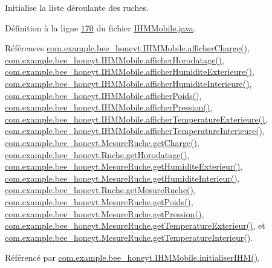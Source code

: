 Initialise la liste déroulante des ruches. 



Définition à la ligne \hyperlink{_i_h_m_mobile_8java_source_l00170}{170} du fichier \hyperlink{_i_h_m_mobile_8java_source}{I\+H\+M\+Mobile.\+java}.



Références \hyperlink{_i_h_m_mobile_8java_source_l00289}{com.\+example.\+bee\+\_\+honeyt.\+I\+H\+M\+Mobile.\+afficher\+Charge()}, \hyperlink{_i_h_m_mobile_8java_source_l00298}{com.\+example.\+bee\+\_\+honeyt.\+I\+H\+M\+Mobile.\+afficher\+Horodatage()}, \hyperlink{_i_h_m_mobile_8java_source_l00262}{com.\+example.\+bee\+\_\+honeyt.\+I\+H\+M\+Mobile.\+afficher\+Humidite\+Exterieure()}, \hyperlink{_i_h_m_mobile_8java_source_l00253}{com.\+example.\+bee\+\_\+honeyt.\+I\+H\+M\+Mobile.\+afficher\+Humidite\+Interieure()}, \hyperlink{_i_h_m_mobile_8java_source_l00271}{com.\+example.\+bee\+\_\+honeyt.\+I\+H\+M\+Mobile.\+afficher\+Poids()}, \hyperlink{_i_h_m_mobile_8java_source_l00280}{com.\+example.\+bee\+\_\+honeyt.\+I\+H\+M\+Mobile.\+afficher\+Pression()}, \hyperlink{_i_h_m_mobile_8java_source_l00244}{com.\+example.\+bee\+\_\+honeyt.\+I\+H\+M\+Mobile.\+afficher\+Temperature\+Exterieure()}, \hyperlink{_i_h_m_mobile_8java_source_l00235}{com.\+example.\+bee\+\_\+honeyt.\+I\+H\+M\+Mobile.\+afficher\+Temperature\+Interieure()}, \hyperlink{_mesure_ruche_8java_source_l00112}{com.\+example.\+bee\+\_\+honeyt.\+Mesure\+Ruche.\+get\+Charge()}, \hyperlink{_ruche_8java_source_l00104}{com.\+example.\+bee\+\_\+honeyt.\+Ruche.\+get\+Horodatage()}, \hyperlink{_mesure_ruche_8java_source_l00082}{com.\+example.\+bee\+\_\+honeyt.\+Mesure\+Ruche.\+get\+Humidite\+Exterieur()}, \hyperlink{_mesure_ruche_8java_source_l00072}{com.\+example.\+bee\+\_\+honeyt.\+Mesure\+Ruche.\+get\+Humidite\+Interieur()}, \hyperlink{_ruche_8java_source_l00119}{com.\+example.\+bee\+\_\+honeyt.\+Ruche.\+get\+Mesure\+Ruche()}, \hyperlink{_mesure_ruche_8java_source_l00102}{com.\+example.\+bee\+\_\+honeyt.\+Mesure\+Ruche.\+get\+Poids()}, \hyperlink{_mesure_ruche_8java_source_l00092}{com.\+example.\+bee\+\_\+honeyt.\+Mesure\+Ruche.\+get\+Pression()}, \hyperlink{_mesure_ruche_8java_source_l00062}{com.\+example.\+bee\+\_\+honeyt.\+Mesure\+Ruche.\+get\+Temperature\+Exterieur()}, et \hyperlink{_mesure_ruche_8java_source_l00052}{com.\+example.\+bee\+\_\+honeyt.\+Mesure\+Ruche.\+get\+Temperature\+Interieur()}.



Référencé par \hyperlink{_i_h_m_mobile_8java_source_l00152}{com.\+example.\+bee\+\_\+honeyt.\+I\+H\+M\+Mobile.\+initialiser\+I\+H\+M()}.


